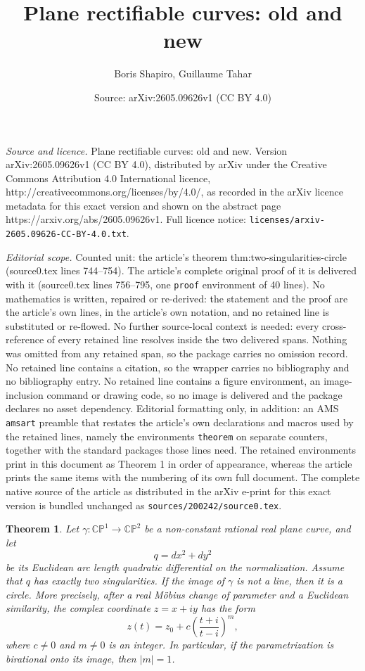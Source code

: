 \documentclass[10pt,a4paper]{amsart}
\title{Plane rectifiable curves: old and new}
\author{Boris Shapiro, Guillaume Tahar}
\date{Source: arXiv:2605.09626v1 (CC BY 4.0)}
\newtheorem{theorem}{Theorem}
\newcommand {\bCP} {\mathbb {CP}}
\begin{document}
\maketitle

\noindent\emph{Source and licence.} Plane rectifiable curves: old and new. Version arXiv:2605.09626v1 (CC BY 4.0), distributed by arXiv under the Creative Commons Attribution 4.0 International licence, http://creativecommons.org/licenses/by/4.0/, as recorded in the arXiv licence metadata for this exact version and shown on the abstract page https://arxiv.org/abs/2605.09626v1. Full licence notice: \texttt{licenses/arxiv-2605.09626-CC-BY-4.0.txt}.\par\smallskip

\noindent\textit{Editorial scope.} Counted unit: the article's theorem thm:two-singularities-circle (source0.tex lines 744--754). The article's complete original proof of it is delivered with it (source0.tex lines 756--795, one \texttt{proof} environment of 40 lines). No mathematics is written, repaired or re-derived: the statement and the proof are the article's own lines, in the article's own notation, and no retained line is substituted or re-flowed.  No further source-local context is needed: every cross-reference of every retained line resolves inside the two delivered spans.  Nothing was omitted from any retained span, so the package carries no omission record.  No retained line contains a citation, so the wrapper carries no bibliography and no bibliography entry.  No retained line contains a figure environment, an image-inclusion command or drawing code, so no image is delivered and the package declares no asset dependency.  Editorial formatting only, in addition: an AMS \texttt{amsart} preamble that restates the article's own declarations and macros used by the retained lines, namely the environments \texttt{theorem} on separate counters, together with the standard packages those lines need.  The retained environments print in this document as Theorem 1 in order of appearance, whereas the article prints the same items with the numbering of its own full document.  The complete native source of the article as distributed in the arXiv e-print for this exact version is bundled unchanged as \texttt{sources/200242/source0.tex}.
\begin{theorem}\label{thm:two-singularities-circle}
Let $\gamma:\bCP^{1}\to \bCP^{2}$ be a non-constant rational real plane curve, and let
\[
q=dx^{2}+dy^{2}
\]
be its Euclidean arc length quadratic differential on the normalization. Assume that $q$ has exactly two singularities. If the image of $\gamma$ is not a line, then it is a circle. More precisely, after a real M\"obius change of parameter and a Euclidean similarity, the complex coordinate $z=x+iy$ has the form
\[
z(t)=z_{0}+c\left(\frac{t+i}{t-i}\right)^{m},
\]
where $c\neq 0$ and $m\neq 0$ is an integer. In particular, if the parametrization is birational onto its image, then $|m|=1$.
\end{theorem}
\end{document}
